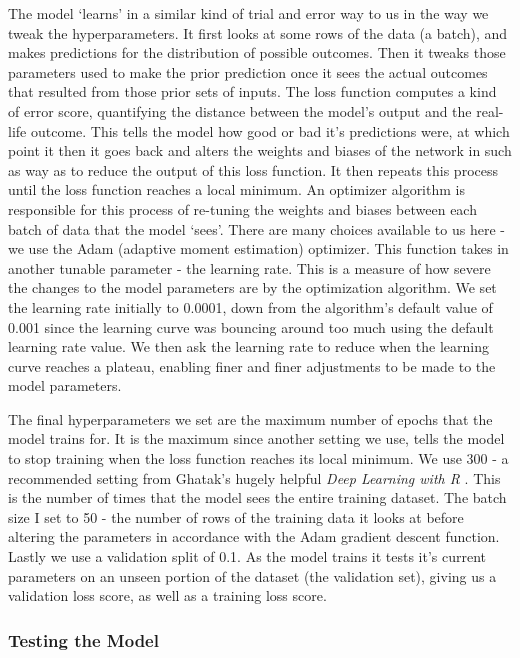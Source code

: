 The model `learns' in a similar kind of trial and error way to us in the way we tweak the hyperparameters. It first looks at some rows of the data (a batch), and makes predictions for the distribution of possible outcomes. Then it tweaks those parameters used to make the prior prediction once it sees the actual outcomes that resulted from those prior sets of inputs. The loss function computes a kind of error score, quantifying the distance between the model's output and the real-life outcome. This tells the model how good or bad it's predictions were, at which point it then it goes back and alters the weights and biases of the network in such as way as to reduce the output of this loss function. It then repeats this process until the loss function reaches a local minimum. An optimizer algorithm is responsible for this process of re-tuning the weights and biases between each batch of data that the model `sees'. There are many choices available to us here - we use the Adam (adaptive moment estimation) optimizer. This function takes in another tunable parameter - the learning rate. This is a measure of how severe the changes to the model parameters are by the optimization algorithm. We set the learning rate initially to 0.0001, down from the algorithm's default value of 0.001 since the learning curve was bouncing around too much using the default learning rate value. We then ask the learning rate to reduce when the learning curve reaches a plateau, enabling finer and finer adjustments to be made to the model parameters.

The final hyperparameters we set are the maximum number of epochs that the model trains for. It is the maximum since another setting we use, tells the model to stop training when the loss function reaches its local minimum. We use 300 - a recommended setting from Ghatak's hugely helpful \textit{Deep Learning with R} \cite{ghatak_deep_2019}. This is the number of times that the model sees the entire training dataset. The batch size I set to 50 - the number of rows of the training data it looks at before altering the parameters in accordance with the Adam gradient descent function. Lastly we use a validation split of 0.1. As the model trains it tests it's current parameters on an unseen portion of the dataset (the validation set), giving us a validation loss score, as well as a training loss score.

\subsubsection{Testing the Model}

